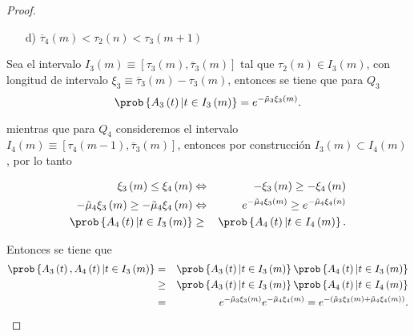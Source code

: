 \begin{proof}
\begin{itemize}
\item[d)] $\overline{\tau}_{4}\left(m\right)<\tau_{2}\left(n\right)
<\tau_{3}\left(m+1\right)$
\end{itemize}


Sea el intervalo $I_{3}\left(m\right)\equiv\left[\tau_{3}\left(m\right),\overline{\tau}_{3}\left(m\right)\right]$ tal que $\tau_{2}\left(n\right)\in I_{3}\left(m\right)$, con longitud de intervalo $\xi_{3}\equiv\overline{\tau}_{3}\left(m\right)-\tau_{3}\left(m\right)$, entonces se tiene que para $Q_{3}$
\begin{equation}
\prob\left\{A_{3}\left(t\right)|t\in I_{3}\left(m\right)\right\}=e^{-\tilde{\mu}_{3}\xi_{3}\left(m\right)}.
\end{equation} 

mientras que para $Q_{4}$ consideremos el intervalo $I_{4}\left(m\right)\equiv\left[\tau_{4}\left(m-1\right),\overline{\tau}_{3}\left(m\right)\right]$, entonces por construcci\'on  $I_{3}\left(m\right)\subset I_{4}\left(m\right)$, por lo tanto


\begin{eqnarray*}
\xi_{3}\left(m\right)\leq\xi_{4}\left(m\right)&\Leftrightarrow& -\xi_{3}\left(m\right)\geq-\xi_{4}\left(m\right)
\\
-\tilde{\mu}_{4}\xi_{3}\left(m\right)\geq-\tilde{\mu}_{4}\xi_{4}\left(m\right)&\Leftrightarrow&
e^{-\tilde{\mu}_{4}\xi_{3}\left(m\right)}\geq e^{-\tilde{\mu}_{4}\xi_{4}\left(n\right)}\\
\prob\left\{A_{4}\left(t\right)|t\in I_{3}\left(m\right)\right\}&\geq&
\prob\left\{A_{4}\left(t\right)|t\in I_{4}\left(m\right)\right\}.
\end{eqnarray*}



Entonces se tiene que
\small{
\begin{eqnarray*}
\prob\left\{A_{3}\left(t\right),A_{4}\left(t\right)|t\in I_{3}\left(m\right)\right\}&=&
\prob\left\{A_{3}\left(t\right)|t\in I_{3}\left(m\right)\right\}
\prob\left\{A_{4}\left(t\right)|t\in I_{3}\left(m\right)\right\}\\
&\geq&
\prob\left\{A_{3}\left(t\right)|t\in I_{3}\left(m\right)\right\}
\prob\left\{A_{4}\left(t\right)|t\in I_{4}\left(m\right)\right\}\\
&=&e^{-\tilde{\mu}_{3}\xi_{3}\left(m\right)}e^{-\tilde{\mu}_{4}\xi_{4}
\left(m\right)}
=e^{-\left(\tilde{\mu}_{3}\xi_{3}\left(m\right)+\tilde{\mu}_{4}\xi_{4}\left(m\right)\right)}.
\end{eqnarray*}}


\end{proof}
